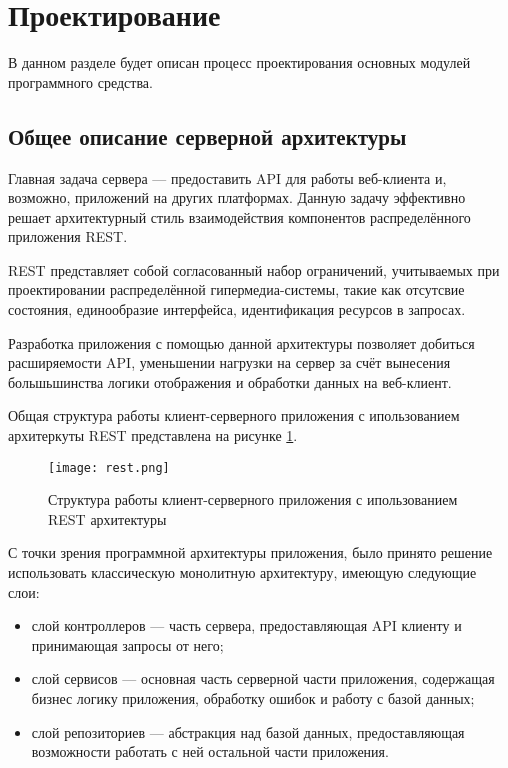 \section{Проектирование}

В данном разделе будет описан процесс проектирования основных
модулей программного средства.

\subsection{Общее описание серверной архитектуры}
\label{sec:overview}

Главная задача сервера --- предоставить API для работы веб-клиента и, возможно,
приложений на других платформах. Данную задачу эффективно решает архитектурный 
стиль взаимодействия компонентов распределённого приложения REST.

REST представляет собой согласованный набор ограничений, учитываемых при 
проектировании распределённой гипермедиа-системы, такие как отсутсвие состояния, 
единообразие интерфейса, идентификация ресурсов в запросах. 

Разработка приложения с помощью данной архитектуры позволяет добиться расширяемости API,
уменьшении нагрузки на сервер за счёт вынесения большьшинства логики отображения и обработки 
данных на веб-клиент.

Общая структура работы клиент-серверного приложения с ипользованием архитеркуты 
REST представлена на рисунке \ref{fig:rest}.

\begin{figure}[h] 
  \centering  
  \texttt{[image: rest.png]}
  \caption{Структура работы клиент-серверного приложения с ипользованием REST архитектуры}
  \label{fig:rest}
\end{figure}

С точки зрения программной архитектуры приложения, было принято решение использовать 
классическую монолитную архитектуру, имеющую следующие слои:

\begin{itemize}
  \item слой контроллеров --- часть сервера, предоставляющая API клиенту и принимающая 
  запросы от него;
  \item слой сервисов --- основная часть серверной части приложения, содержащая бизнес логику 
  приложения, обработку ошибок и работу с базой данных;
  \item слой репозиториев --- абстракция над базой данных, предоставляющая возможности работать с ней 
  остальной части приложения.
\end{itemize}

